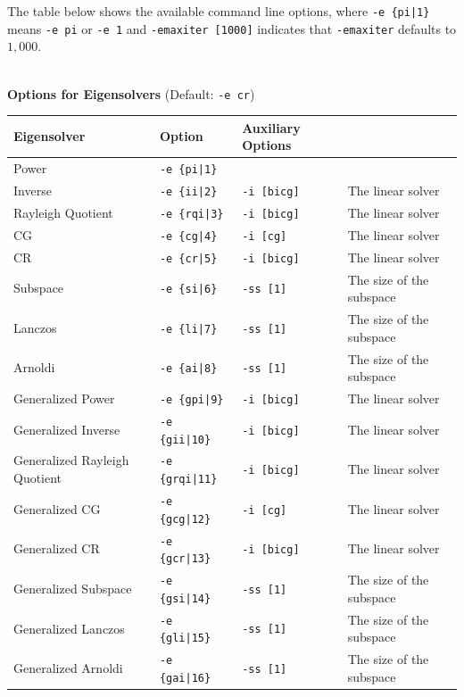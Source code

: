 \documentclass[a4paper]{article}
\begin{document}
The table below shows the available command line options, 
where \verb=-e {pi|1}= means \verb=-e pi= or \verb=-e 1= and \verb=-emaxiter [1000]= indicates 
that \verb=-emaxiter= defaults to $1,000$.
\\
\\
\begin{minipage}[t]{\textwidth}
\begin{center}
{\bf Options for Eigensolvers} (Default: \verb=-e cr=) \\
\begin{tabular}{l|lll}\hline\hline
 Eigensolver      & Option              &  Auxiliary Options  & \\ \hline
\hline
 Power                             & \verb=-e {pi|1}=        &    \\ 
 Inverse                           & \verb=-e {ii|2}=        & 
 \verb=-i [bicg]= & The linear solver \\
 Rayleigh Quotient                 & \verb=-e {rqi|3}=       &
 \verb=-i [bicg]= & The linear solver \\
 CG                                & \verb=-e {cg|4}=        &
 \verb=-i [cg]= & The linear solver \\ 
 CR                                & \verb=-e {cr|5}=        &
 \verb=-i [bicg]= & The linear solver \\ 
 Subspace                          & \verb=-e {si|6}=        &
 \verb=-ss [1]= & The size of the subspace \\
 Lanczos                           & \verb=-e {li|7}=        &
 \verb=-ss [1]= & The size of the subspace \\
 Arnoldi                           & \verb=-e {ai|8}=        &
 \verb=-ss [1]= & The size of the subspace \\
 Generalized Power                 & \verb=-e {gpi|9}=      &
 \verb=-i [bicg]= & The linear solver \\ 
 Generalized Inverse               & \verb=-e {gii|10}=      & 
 \verb=-i [bicg]= & The linear solver \\
 Generalized Rayleigh Quotient     & \verb=-e {grqi|11}=      & 
 \verb=-i [bicg]= & The linear solver \\ 
 Generalized CG                    & \verb=-e {gcg|12}=      & 
 \verb=-i [cg]= & The linear solver \\
 Generalized CR                    & \verb=-e {gcr|13}=      & 
 \verb=-i [bicg]= & The linear solver \\
 Generalized Subspace              & \verb=-e {gsi|14}=      &
 \verb=-ss [1]= & The size of the subspace \\
 Generalized Lanczos               & \verb=-e {gli|15}=      &
 \verb=-ss [1]= & The size of the subspace \\
 Generalized Arnoldi               & \verb=-e {gai|16}=      &
 \verb=-ss [1]= & The size of the subspace \\  


\end{tabular}
\end{center}
\end{minipage}
\end{document}
